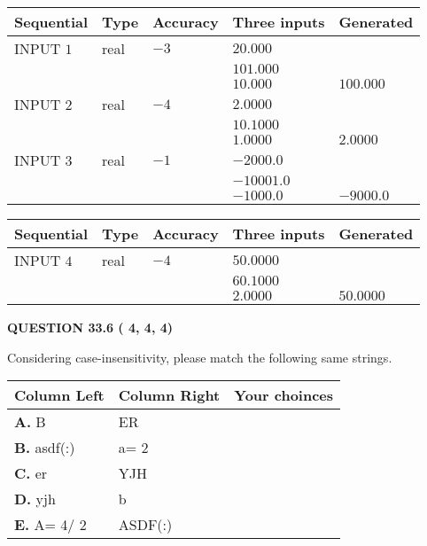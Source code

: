 \documentclass[12pt]{article}
\begin{document}
   
  
  
\noindent\begin{tabular}{|l|l|l|l|l|}
\hline
 Sequential & Type & Accuracy & Three inputs & Generated \\ 
\hline
 
 
  INPUT $           1$ & real & $          -3 $ & $
 20.000
  $ & \\
  & & &  $
 101.000
  $ & \\
  & & &  $
 10.000
 $ & $ 100.000 $ 
 \\  \hline  
 
 
  INPUT $           2$ & real & $          -4 $ & $
 2.0000
  $ & \\
  & & &  $
 10.1000
  $ & \\
  & & &  $
 1.0000
 $ & $ 2.0000 $ 
 \\  \hline  
 
 
  INPUT $           3$ & real & $          -1 $ & $
 -2000.0
  $ & \\
  & & &  $
 -10001.0
  $ & \\
  & & &  $
 -1000.0
 $ & $ -9000.0 $ 
 \\  \hline  
 \end{tabular}
   
   
  
  
\noindent\begin{tabular}{|l|l|l|l|l|}
\hline
 Sequential & Type & Accuracy & Three inputs & Generated \\ 
\hline
 
 
  INPUT $           4$ & real & $          -4 $ & $
 50.0000
  $ & \\
  & & &  $
 60.1000
  $ & \\
  & & &  $
 2.0000
 $ & $ 50.0000 $ 
 \\  \hline  
 \end{tabular}
   
   
  
\vspace{0.2in}
  
{\textbf{\Large{QUESTION
33.6 
 (          4,          4,          4)
}}}
  
  
Considering case-insensitivity, please match the following same strings.
  
  
\begin{tabular}{|l|l|l|}
 \hline
 Column Left & Column Right  & Your choinces \\ 
 \hline
{\textbf{\large{
A.}}}
B
  & 
ER
 & 
 \\ 
 \hline
{\textbf{\large{
B.}}}
asdf(:)
  & 
 a= %
2
 & 
 \\ 
 \hline
{\textbf{\large{
C.}}}
er
  & 
YJH
 & 
 \\ 
 \hline
{\textbf{\large{
D.}}}
yjh
  & 
b
 & 
 \\ 
 \hline
{\textbf{\large{
E.}}}
 A= %
4/ %
2

  & 
ASDF(:)
 & 
 \\ 
 \hline
 \end{tabular}
  
\end{document}
